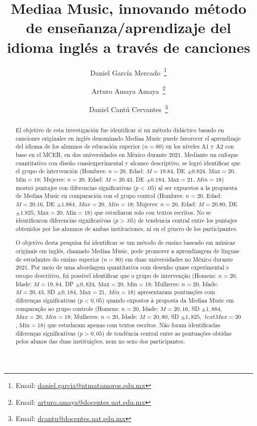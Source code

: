 \documentclass[spanish]{textolivre}
\title{Mediaa Music, innovando método de enseñanza/aprendizaje del idioma inglés a través de canciones}
\author[1]{Daniel García Mercado~\orcid{0000-0002-7041-3367}\thanks{Email: \href{mailto:daniel.garcia@utmatamoros.edu.mx}{daniel.garcia@utmatamoros.edu.mx}}}
\author[2]{Arturo Amaya Amaya~\orcid{0000-0002-6614-4256}\thanks{Email: \href{mailto:arturo.amaya@docentes.uat.edu.mx}{arturo.amaya@docentes.uat.edu.mx}}}
\author[1]{Daniel Cantú Cervantes~\orcid{0000-0001-8652-3707}\thanks{Email: \href{mailto:dcantu@docentes.uat.edu.mx}{dcantu@docentes.uat.edu.mx}}}
\affil[1]{Universidad Tecnológica de Matamoros, México.}
\affil[2]{Universidad Autónoma de Tamaulipas, México.}
\begin{document}
\maketitle

\begin{polyabstract}
\begin{abstract}
El objetivo de esta investigación fue identificar si un método didáctico basado en canciones originales en inglés denominado Mediaa Music puede favorecer el aprendizaje del idioma de los alumnos de educación superior ($n=80$) en los niveles A1 y A2 con base en el MCER, en dos universidades en México durante 2021. Mediante un enfoque cuantitativo con diseño cuasiexperimental y alcance descriptivo, se logró identificar que el grupo de intervención (Hombres: $n=20$, Edad: $M=19.84$, DE $\pm 0.824$, $\text{Max}=20$, $\text{Min}=18$; Mujeres: $n=20$, Edad: $M=20.43$, DE $\pm 0.184$, $\text{Max}=21$, $Min=18$) mostró puntajes con diferencias significativas ($p<.05$) al ser expuestos a la propuesta de Mediaa Music en comparación con el grupo control (Hombres: $n=20$, Edad: $M=20.16$, DE $\pm 1.884$, $Max=20$, $Min=18$; Mujeres: $n=20$, Edad: $M=20.80$, DE $\pm 1.825$, $\text{Max}=20$, $\text{Min}=18$) que estudiaron solo con textos escritos. No se identificaron diferencias significativas ($p>.05$) de tendencia central entre los puntajes obtenidos por los alumnos de ambas instituciones, ni en el género de los participantes.

\end{abstract}

\begin{portuguese}
\begin{abstract}
O objetivo desta pesquisa foi identificar se um método de ensino baseado em músicas originais em inglês, chamado Mediaa Music, pode promover a aprendizagem de línguas de estudantes do ensino superior ($n=$80) em duas universidades no México durante 2021. Por meio de uma abordagem quantitativa com desenho quase experimental e escopo descritivo, foi possível identificar que o grupo de intervenção (Homens: $n=20$, Idade: $M=19,84$, DP $\pm 0,824 $, $\text{Max}=20$, $\text{Min}=18$; Mulheres: $n=20$, Idade: $M=20,43$, SD $\pm 0,184$, $\text{Max}=21$, $Min=18$) apresentaram pontuações com diferenças significativas ($p<0,05$) quando expostos à proposta da Mediaa Music em comparação ao grupo controle (Homens: $n=20$, Idade: $M= 20,16$, SD $\pm 1,884$, $Max=20$, $Min=18$; Mulheres: $n=20$, Idade: $M=20,80$, SD $\pm 1,825$, $\ text{Max }=20$, $\text{Min}=18$) que estudaram apenas com textos escritos. Não foram identificadas diferenças significativas ($p>0,05$) de tendência central entre as pontuações obtidas pelos alunos das duas instituições, nem no sexo dos participantes.


\end{abstract}
\end{portuguese}
\end{polyabstract}
\end{document}
